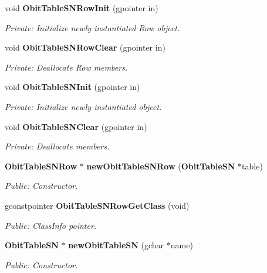\begin{CompactItemize}
\item 
void {\bf Obit\-Table\-SNRow\-Init} (gpointer in)
\begin{CompactList}\small\item\em Private: Initialize newly instantiated Row object. \item\end{CompactList}\item 
void {\bf Obit\-Table\-SNRow\-Clear} (gpointer in)
\begin{CompactList}\small\item\em Private: Deallocate Row members. \item\end{CompactList}\item 
void {\bf Obit\-Table\-SNInit} (gpointer in)
\begin{CompactList}\small\item\em Private: Initialize newly instantiated object. \item\end{CompactList}\item 
void {\bf Obit\-Table\-SNClear} (gpointer in)
\begin{CompactList}\small\item\em Private: Deallocate members. \item\end{CompactList}\item 
{\bf Obit\-Table\-SNRow} $\ast$ {\bf new\-Obit\-Table\-SNRow} ({\bf Obit\-Table\-SN} $\ast$table)
\begin{CompactList}\small\item\em Public: Constructor. \item\end{CompactList}\item 
gconstpointer {\bf Obit\-Table\-SNRow\-Get\-Class} (void)
\begin{CompactList}\small\item\em Public: Class\-Info pointer. \item\end{CompactList}\item 
{\bf Obit\-Table\-SN} $\ast$ {\bf new\-Obit\-Table\-SN} (gchar $\ast$name)
\begin{CompactList}\small\item\em Public: Constructor. \item\end{CompactList}\item 

\end{CompactItemize}
